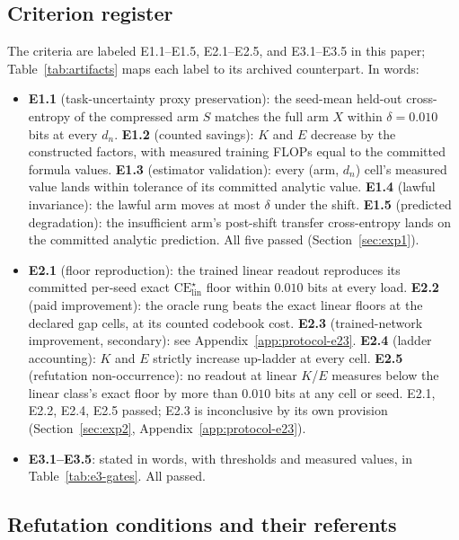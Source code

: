 \documentclass[twocolumn,10pt]{article}
\theoremstyle{definition}
\theoremstyle{remark}
\newcommand{\dn}{d_n}
\newcommand{\CE}{\mathrm{CE}}
\begin{document}
\subsection{Criterion register}
\label{app:protocol-criteria}

The criteria are labeled E1.1--E1.5, E2.1--E2.5, and E3.1--E3.5 in
this paper; Table~\ref{tab:artifacts} maps each label to its archived
counterpart. In words:

\begin{itemize}
\item \textbf{E1.1} (task-uncertainty proxy preservation): the seed-mean held-out
cross-entropy of the compressed arm $S$ matches the full arm $X$
within $\delta = 0.010$ bits at every $\dn$. \textbf{E1.2} (counted
savings): $K$ and $E$ decrease by the constructed factors, with
measured training FLOPs equal to the committed formula values.
\textbf{E1.3} (estimator validation): every (arm, $\dn$) cell's
measured value lands within tolerance of its committed analytic value.
\textbf{E1.4} (lawful invariance): the lawful arm moves at most
$\delta$ under the shift. \textbf{E1.5} (predicted degradation): the
insufficient arm's post-shift transfer cross-entropy lands on the
committed analytic prediction. All five passed
(Section~\ref{sec:exp1}).
\item \textbf{E2.1} (floor reproduction): the trained linear readout
reproduces its committed per-seed exact $\CE^{\star}_{\mathrm{lin}}$
floor within $0.010$ bits at every load. \textbf{E2.2} (paid
improvement): the oracle rung beats the exact linear floors at the
declared gap cells, at its counted codebook cost. \textbf{E2.3}
(trained-network improvement, secondary): see
Appendix~\ref{app:protocol-e23}. \textbf{E2.4} (ladder accounting):
$K$ and $E$ strictly increase up-ladder at every cell. \textbf{E2.5}
(refutation non-occurrence): no readout at linear $K$/$E$ measures
below the linear class's exact floor by more than $0.010$ bits at any
cell or seed. E2.1, E2.2, E2.4, E2.5 passed; E2.3 is inconclusive by
its own provision (Section~\ref{sec:exp2},
Appendix~\ref{app:protocol-e23}).
\item \textbf{E3.1--E3.5}: stated in words, with thresholds and
measured values, in Table~\ref{tab:e3-gates}. All passed.
\end{itemize}

\subsection{Refutation conditions and their referents}
\label{app:protocol-falsifiers}
\end{document}
